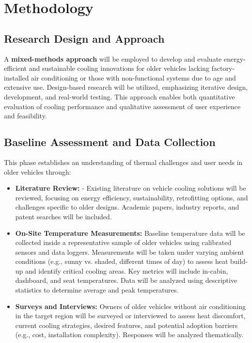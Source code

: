 \documentclass{article}
\theoremstyle{mytheoremstyle}
\theoremstyle{mytheoremstyle}
\theoremstyle{myproblemstyle}
\begin{document}
   \section{Methodology}\label{sec:methodology} %
   \subsection{Research Design and Approach}
   A \textbf{mixed-methods approach} will be employed to develop and evaluate energy-efficient and sustainable cooling innovations for older vehicles lacking factory-installed air conditioning or those with non-functional systems due to age and extensive use. Design-based research will be utilized, emphasizing iterative design, development, and real-world testing. This approach enables both quantitative evaluation of cooling performance and qualitative assessment of user experience and feasibility.
\subsection{Baseline Assessment and Data Collection}
This phase establishes an understanding of thermal challenges and user needs in older vehicles through:
	\begin{itemize}
	\item \textbf{Literature Review:} - Existing literature on vehicle cooling solutions will be reviewed, focusing on energy efficiency, sustainability, retrofitting options, and challenges specific to older designs. Academic papers, industry reports, and patent searches will be included.
	\item  \textbf{On-Site Temperature Measurements:} Baseline temperature data will be collected inside a representative sample of older vehicles using calibrated sensors and data loggers. Measurements will be taken under varying ambient conditions (e.g., sunny vs. shaded, different times of day) to assess heat build-up and identify critical cooling areas. Key metrics will include in-cabin, dashboard, and seat temperatures. Data will be analyzed using descriptive statistics to determine average and peak temperatures.
	\item \textbf{Surveys and Interviews:} Owners of older vehicles without air conditioning in the target region will be surveyed or interviewed to assess heat discomfort, current cooling strategies, desired features, and potential adoption barriers (e.g., cost, installation complexity). Responses will be analyzed thematically.
       \end{itemize}
\end{document}
